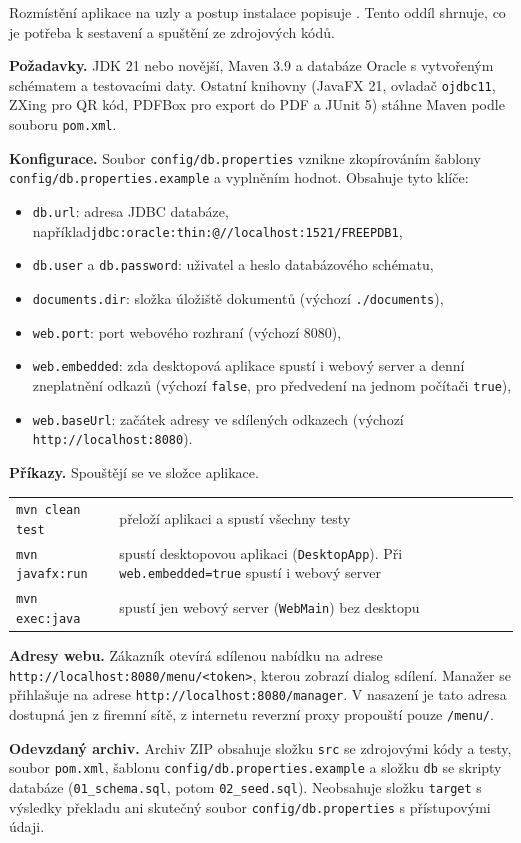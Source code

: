 Rozmístění aplikace na uzly a postup instalace popisuje . Tento oddíl shrnuje, co je potřeba k sestavení a spuštění ze zdrojových kódů.

\textbf{Požadavky.} JDK 21 nebo novější, Maven 3.9 a databáze Oracle s vytvořeným schématem a testovacími daty. Ostatní knihovny (JavaFX 21, ovladač \texttt{ojdbc11}, ZXing pro QR kód, PDFBox pro export do PDF a JUnit 5) stáhne Maven podle souboru \texttt{pom.xml}.

\textbf{Konfigurace.} Soubor \texttt{config/db.properties} vznikne zkopírováním šablony \texttt{config/db.properties.example} a vyplněním hodnot. Obsahuje tyto klíče:

\begin{itemize}[itemsep=0pt]
  \item \texttt{db.url}: adresa JDBC databáze, například\newline \texttt{jdbc:oracle:thin:@//localhost:1521/FREEPDB1},
  \item \texttt{db.user} a \texttt{db.password}: uživatel a heslo databázového schématu,
  \item \texttt{documents.dir}: složka úložiště dokumentů (výchozí \texttt{./documents}),
  \item \texttt{web.port}: port webového rozhraní (výchozí 8080),
  \item \texttt{web.embedded}: zda desktopová aplikace spustí i webový server a denní zneplatnění odkazů (výchozí \texttt{false}, pro předvedení na jednom počítači \texttt{true}),
  \item \texttt{web.baseUrl}: začátek adresy ve sdílených odkazech (výchozí \texttt{http://localhost:8080}).
\end{itemize}

\textbf{Příkazy.} Spouštějí se ve složce aplikace.

\begin{tabularx}{\textwidth}{@{}l>{\raggedright\arraybackslash}X@{}}
  \texttt{mvn clean test} & přeloží aplikaci a spustí všechny testy \\
  \texttt{mvn javafx:run} & spustí desktopovou aplikaci (\texttt{DesktopApp}). Při \texttt{web.embedded=true} spustí i webový server \\
  \texttt{mvn exec:java} & spustí jen webový server (\texttt{WebMain}) bez desktopu \\
\end{tabularx}

\textbf{Adresy webu.} Zákazník otevírá sdílenou nabídku na adrese \texttt{http://localhost:8080/menu/<token>}, kterou zobrazí dialog sdílení. Manažer se přihlašuje na adrese \texttt{http://localhost:8080/manager}. V nasazení je tato adresa dostupná jen z firemní sítě, z internetu reverzní proxy propouští pouze \texttt{/menu/}.

\textbf{Odevzdaný archiv.} Archiv ZIP obsahuje složku \texttt{src} se zdrojovými kódy a testy, soubor \texttt{pom.xml}, šablonu \texttt{config/db.properties.example} a složku \texttt{db} se skripty databáze (\texttt{01\_schema.sql}, potom \texttt{02\_seed.sql}). Neobsahuje složku \texttt{target} s výsledky překladu ani skutečný soubor \texttt{config/db.properties} s přístupovými údaji.
\endgroup
